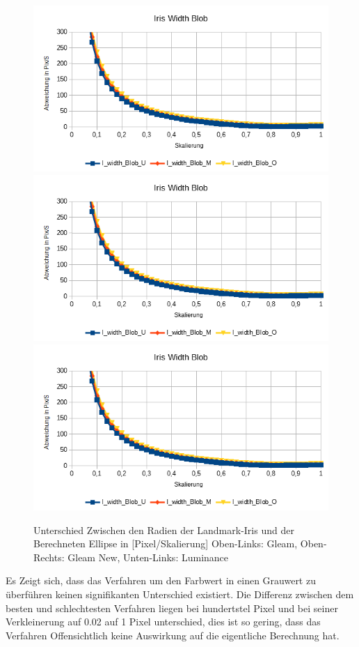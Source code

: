 \begin{figure}
	\centering
	\includegraphics[width=0.45\linewidth]{ElSe_Img/ElSe_22G_Iris_Width}
	\includegraphics[width=0.45\linewidth]{ElSe_Img/ElSe_Gray_15_Iris_Width}
	\includegraphics[width=0.45\linewidth]{ElSe_Img/ElSe_Norm_15_Iris_Width}
	\caption{Unterschied Zwischen den Radien der Landmark-Iris und der Berechneten Ellipse in [Pixel/Skalierung] Oben-Links: Gleam, Oben-Rechts: Gleam New, Unten-Links: Luminance}
	\label{ElSe_Gray_Width}
\end{figure}
Es Zeigt sich, dass das Verfahren um den Farbwert in einen Grauwert zu überführen keinen signifikanten Unterschied existiert. Die Differenz zwischen dem besten und schlechtesten Verfahren liegen bei hundertstel Pixel und bei seiner Verkleinerung auf 0.02 auf 1 Pixel unterschied, dies ist so gering, dass das Verfahren Offensichtlich keine Auswirkung auf die eigentliche Berechnung hat.
